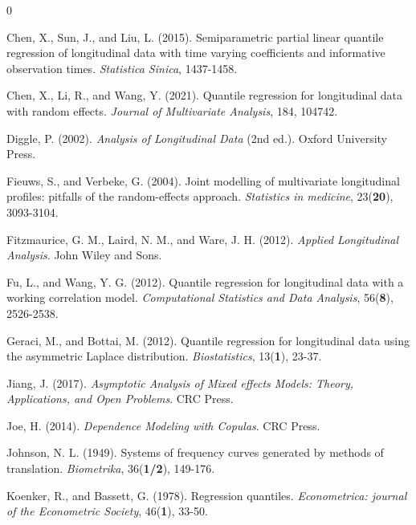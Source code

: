 \documentclass[twoside]{article}
\begin{document}
\begin{thebibliography}{0}
\small
	
	 Chen, X., Sun, J., and Liu, L. (2015). Semiparametric partial linear quantile regression of longitudinal data with time varying coefficients and informative observation times. \textit{Statistica Sinica}, 1437-1458.
	
	 Chen, X., Li, R., and Wang, Y. (2021). Quantile regression for longitudinal data with random effects. \textit{Journal of Multivariate Analysis}, 184, 104742.
	
	 Diggle, P. (2002). \textit{Analysis of Longitudinal Data} (2nd ed.). Oxford University Press.
	
	 Fieuws, S., and Verbeke, G. (2004). Joint modelling of multivariate longitudinal profiles: pitfalls of the random-effects approach. \textit{Statistics in medicine}, 23(\textbf{20}), 3093-3104.
	
	 Fitzmaurice, G. M., Laird, N. M., and Ware, J. H. (2012). \textit{Applied Longitudinal Analysis}. John Wiley and Sons.
	
	 Fu, L., and Wang, Y. G. (2012). Quantile regression for longitudinal data with a working correlation model. \textit{Computational Statistics and Data Analysis}, 56(\textbf{8}), 2526-2538.
	
	 Geraci, M., and Bottai, M. (2012). Quantile regression for longitudinal data using the asymmetric Laplace distribution. \textit{Biostatistics}, 13(\textbf{1}), 23-37.
	
	 Jiang, J. (2017). \textit{Asymptotic Analysis of Mixed effects Models: Theory, Applications, and Open Problems}. CRC Press.
	
	 Joe, H. (2014). \textit{Dependence Modeling with Copulas}. CRC Press.
	
	 Johnson, N. L. (1949). Systems of frequency curves generated by methods of translation. \textit{Biometrika}, 36(\textbf{1/2}), 149-176.
	
	 Koenker, R., and Bassett, G. (1978). Regression quantiles. \textit{Econometrica: journal of the Econometric Society}, 46(\textbf{1}), 33-50.
	

\end{thebibliography}
\end{document}
